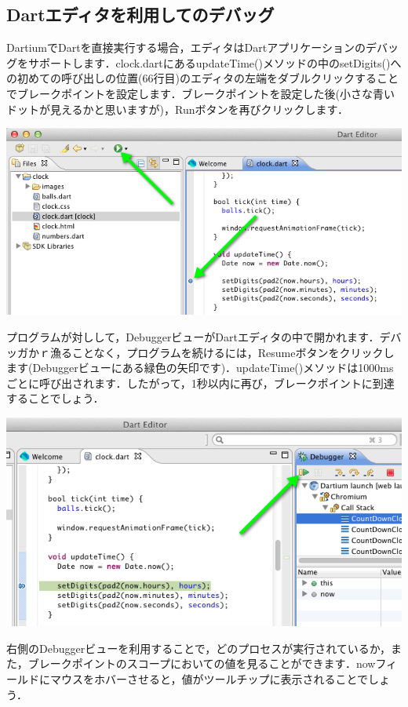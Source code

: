 \subsection{Dartエディタを利用してのデバッグ}

DartiumでDartを直接実行する場合，エディタはDartアプリケーションのデバッグをサポートします．clock.dartにあるupdateTime()メソッドの中のsetDigits()への初めての呼び出しの位置(66行目)のエディタの左端をダブルクリックすることでブレークポイントを設定します．ブレークポイントを設定した後(小さな青いドットが見えるかと思いますが)，Runボタンを再びクリックします．

\includegraphics{step1/debug_img1.png}

プログラムが対しして，DebuggerビューがDartエディタの中で開かれます．デバッガかｒ漁ることなく，プログラムを続けるには，Resumeボタンをクリックします(Debuggerビューにある緑色の矢印です)．updateTime()メソッドは1000msごとに呼び出されます．したがって，1秒以内に再び，ブレークポイントに到達することでしょう．

\includegraphics{step1/debug_img2.png}

右側のDebuggerビューを利用することで，どのプロセスが実行されているか，また，ブレークポイントのスコープにおいての値を見ることができます．nowフィールドにマウスをホバーさせると，値がツールチップに表示されることでしょう．

